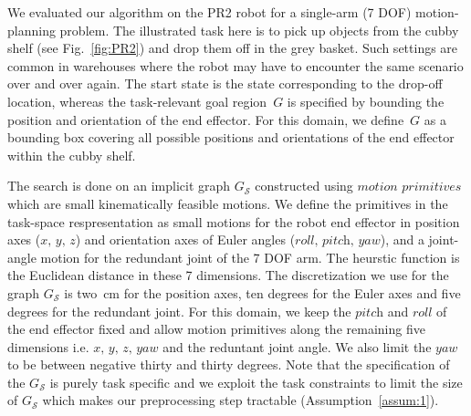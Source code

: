 \documentclass[letterpaper]{article} %
\newcommand{\calS}{\ensuremath{\mathcal{S}}\xspace}
\begin{document}
We evaluated our algorithm on the PR2 robot for a single-arm (7 DOF) motion-planning problem. The illustrated task here is to pick up objects from the cubby shelf (see Fig.~\ref{fig:PR2}) and drop them off in the grey basket. Such settings are common in warehouses where the robot may have to encounter the same scenario over and over again. The start state is the state corresponding to the drop-off location, whereas the task-relevant goal region~$G$ is specified by bounding the position and orientation of the end effector. For this domain, we define~$G$ as a bounding box covering all possible positions and orientations of the end effector within the cubby shelf.

The search is done on an implicit graph $G_\calS$ constructed using $\textit{motion primitives}$ which are small kinematically feasible motions. We define the primitives in the task-space respresentation as small motions for the robot end effector in position axes ($\textit{x, y, z}$) and orientation axes of Euler angles ($\textit{roll, pitch, yaw}$), and a joint-angle motion for the redundant joint of the 7 DOF arm. 
The heurstic function is the Euclidean distance in these 7 dimensions. The discretization we use for the graph $G_\calS$ is two~cm for the position axes, ten degrees for the Euler axes and five degrees for the redundant joint. 
For this domain, we keep the $\textit{pitch}$ and $\textit{roll}$ of the end effector fixed and allow motion primitives along the remaining five dimensions i.e. $\textit{x, y, z, yaw}$ and the reduntant joint angle. We also limit the $\textit{yaw}$ to be between negative thirty and thirty degrees. Note that the specification of the $G_\calS$ is purely task specific and we exploit the task constraints to limit the size of $G_\calS$ which makes our preprocessing step tractable (Assumption~\ref{assum:1}).
\end{document}
